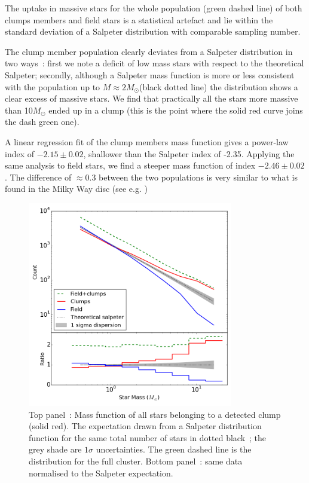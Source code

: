The uptake  in massive stars for the whole population (green dashed line) of both clumps members and field stars is a statistical artefact and lie within the standard deviation of a Salpeter distribution with comparable sampling number. 

The clump member population clearly deviates from a Salpeter distribution in two ways~: first we note a deficit of low mass stars with respect to the theoretical Salpeter; secondly, although a Salpeter mass function is more or less consistent with the population up to $M\approx 2M_\odot$(black dotted line) the distribution shows a clear excess of massive stars. We find that practically all the stars more massive than 10$M_\odot$ ended up in a clump (this is the point where the solid red curve joins the dash green one). 

A linear regression fit of the clump members mass function gives a power-law index of $-2.15 \pm 0.02$, shallower than the Salpeter index of -2.35. Applying the same analysis to field stars,  we find a steeper mass function of index $-2.46 \pm 0.02$. The difference of $\approx 0.3 $ between the two populations is very similar to what is found in the Milky Way disc (see e.g. \citealt{Czekaj2014,Rybizki2015,Bastian2010} )

\begin{figure}
\begin{center}
\includegraphics[width=0.8\textwidth]{Figures/2_ClumpMembers}
\caption{Top panel~: Mass function of all stars belonging to a detected clump (solid red). The expectation drawn from a Salpeter distribution function for the same total number of stars in dotted black~; the grey shade are $1\sigma$ uncertainties. The green dashed line is the  distribution for the full cluster. Bottom panel~:  same data normalised to the Salpeter expectation.}
\label{Fig:2_ClumpMembers}
\end{center}
\end{figure}

